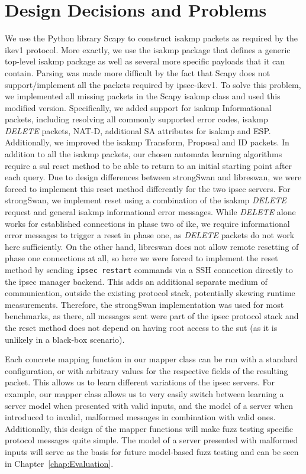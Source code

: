 \section{Design Decisions and Problems} \label{subsec:design}
We use the Python library Scapy to construct \ac{isakmp} packets as required by the \ac{ike}v1 protocol. More exactly, we use the \ac{isakmp} package that defines a generic top-level \ac{isakmp} package as well as several more specific payloads that it can contain. Parsing was made more difficult by the fact that Scapy does not support/implement all the packets required by \ac{ipsec}-\ac{ike}v1. To solve this problem, we implemented all missing packets in the Scapy \ac{isakmp} class and used this modified version. Specifically, we added support for \ac{isakmp} Informational packets, including resolving all commonly supported error codes, \ac{isakmp} \emph{DELETE} packets, NAT-D, additional SA attributes for \ac{isakmp} and ESP. Additionally, we improved the \ac{isakmp} Transform, Proposal and ID packets. In addition to all the \ac{isakmp} packets, our chosen automata learning algorithms require a \ac{sul} reset method to be able to return to an initial starting point after each query. Due to design differences between strongSwan and libreswan, we were forced to implement this reset method differently for the two \ac{ipsec} servers. For strongSwan, we implement reset using a combination of the \ac{isakmp} \emph{DELETE} request and general \ac{isakmp} informational error messages. While \emph{DELETE} alone works for established connections in phase two of \ac{ike}, we require informational error messages to trigger a reset in phase one, as \emph{DELETE} packets do not work here sufficiently. On the other hand, libreswan does not allow remote resetting of phase one connections at all, so here we were forced to implement the reset method by sending \texttt{ipsec restart} commands via a SSH connection directly to the \ac{ipsec} manager backend. This adds an additional separate medium of communication, outside the existing protocol stack, potentially skewing runtime measurements. Therefore, the strongSwan implementation was used for most benchmarks, as there, all messages sent were part of the \ac{ipsec} protocol stack and the reset method does not depend on having root access to the \ac{sut} (as it is unlikely in a black-box scenario).

Each concrete mapping function in our mapper class can be run with a standard configuration, or with arbitrary values for the respective fields of the resulting packet. This allows us to learn different variations of the \ac{ipsec} servers. For example, our mapper class allows us to very easily switch between learning a server model when presented with valid inputs, and the model of a server when introduced to invalid, malformed messages in combination with valid ones. Additionally, this design of the mapper functions will make fuzz testing specific protocol messages quite simple. The model of a server presented with malformed inputs will serve as the basis for future model-based fuzz testing and can be seen in Chapter~\ref{chap:Evaluation}.

